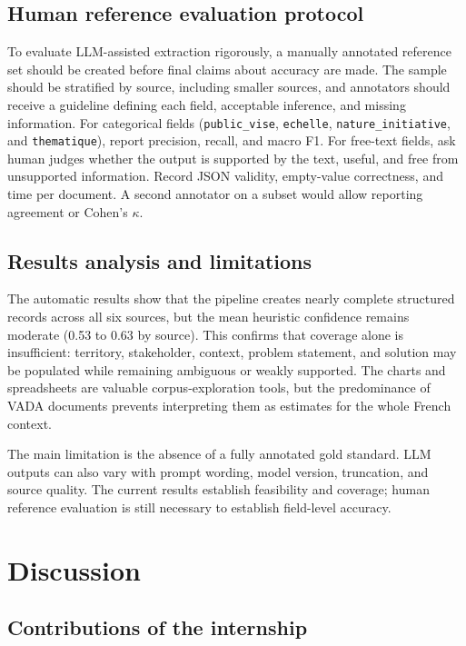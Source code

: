 \section{Human reference evaluation protocol}

To evaluate LLM-assisted extraction rigorously, a manually annotated reference
set should be created before final claims about accuracy are made. The sample
should be stratified by source, including smaller sources, and annotators should
receive a guideline defining each field, acceptable inference, and missing
information. For categorical fields (\texttt{public\_vise}, \texttt{echelle},
\texttt{nature\_initiative}, and \texttt{thematique}), report precision,
recall, and macro F1. For free-text fields, ask human judges whether the output
is supported by the text, useful, and free from unsupported information. Record
JSON validity, empty-value correctness, and time per document. A second
annotator on a subset would allow reporting agreement or Cohen's $\kappa$.

\section{Results analysis and limitations}

The automatic results show that the pipeline creates nearly complete structured
records across all six sources, but the mean heuristic confidence remains
moderate (0.53 to 0.63 by source). This confirms that coverage alone is
insufficient: territory, stakeholder, context, problem statement, and solution
may be populated while remaining ambiguous or weakly supported. The charts and
spreadsheets are valuable corpus-exploration tools, but the predominance of VADA
documents prevents interpreting them as estimates for the whole French context.

The main limitation is the absence of a fully annotated gold standard. LLM
outputs can also vary with prompt wording, model version, truncation, and source
quality. The current results establish feasibility and coverage; human reference
evaluation is still necessary to establish field-level accuracy.

\chapter{Discussion}

\section{Contributions of the internship}

